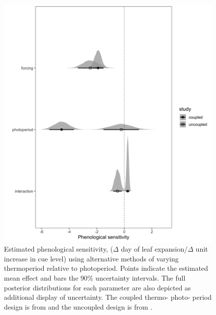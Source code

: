 \documentclass[11pt]{article}
\begin{document}
\begin{figure}[h!]
    \centering
 \includegraphics[width=.8\textwidth]{..//Plots/periodicity_figures/modelcomps_winter.jpeg}
    \caption{Estimated phenological sensitivity, ($\Delta$ day of leaf expansion/$\Delta$ unit increase in cue level) using alternative methods of varying thermoperiod relative to photoperiod. Points indicate the estimated mean effect and bars the 90\% uncertainty intervals. The full posterior distributions for each parameter are also depicted as additional display of uncertainty. The coupled thermo- photo- period design is from \citet{Flynn2018} and the uncoupled design is from \cite{Buonaiuto:2021ug}.}
    \label{fig:compy}
\end{figure}
\end{document}
